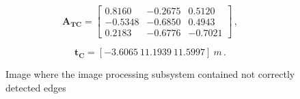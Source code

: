 \begin{equation*}
  \mathbf{A_{TC}} = \begin{bmatrix}
    0.8160  & -0.2675 & 0.5120  \\
    -0.5348 & -0.6850 & 0.4943  \\
    0.2183  & -0.6776 & -0.7021
  \end{bmatrix} \,,
\end{equation*}

\begin{equation*}
  \mathbf{t_C} = [-3.6065 \ 11.1939 \ 11.5997] \ m \,.
\end{equation*}

\begin{figure}[htbp]
  \centering
  \qquad
  \qquad
  \qquad
  \qquad
  \caption{Image where the image processing subsystem contained not correctly detected edges}
  \label{fig:edgeDetection82}
\end{figure}

